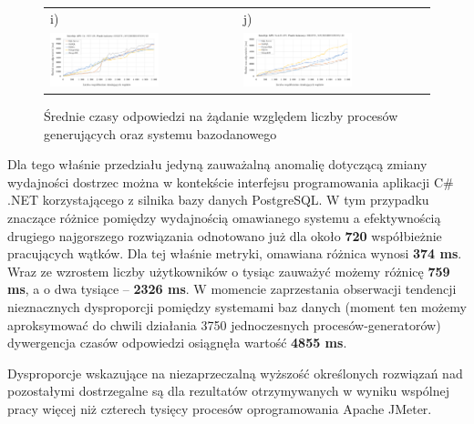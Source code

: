 \begin{figure}[H]
  \advance\leftskip-1.7cm
	\begin{tabular}{@{}ll@{}}
    i) & j) \\
    \includegraphics[width=0.6\textwidth]{rys05/response-dotnet-deleteReservation.pdf} & \includegraphics[width=0.6\textwidth]{rys05/response-nodejs-deleteReservation.pdf} \\
	\end{tabular}
  \caption{Średnie czasy odpowiedzi na żądanie względem liczby procesów generujących oraz systemu bazodanowego}
  \label{fig:response-mtc-1-2}
\end{figure}

Dla tego właśnie przedziału jedyną zauważalną anomalię dotyczącą zmiany wydajności dostrzec można w kontekście interfejsu programowania aplikacji C\# .NET korzystającego z silnika bazy danych PostgreSQL. W tym przypadku znaczące różnice pomiędzy wydajnością omawianego systemu a efektywnością drugiego najgorszego rozwiązania odnotowano już dla około \textbf{720} współbieżnie pracujących wątków. Dla tej właśnie metryki, omawiana różnica wynosi \textbf{374 ms}. Wraz ze wzrostem liczby użytkowników o tysiąc zauważyć możemy różnicę \textbf{759 ms}, a o dwa tysiące -- \textbf{2326 ms}. W momencie zaprzestania obserwacji tendencji nieznacznych dysproporcji pomiędzy systemami baz danych (moment ten możemy aproksymować do chwili działania 3750 jednoczesnych procesów-generatorów) dywergencja czasów odpowiedzi osiągnęła wartość \textbf{4855 ms}.

Dysproporcje wskazujące na niezaprzeczalną wyższość określonych rozwiązań nad pozostałymi dostrzegalne są dla rezultatów otrzymywanych w wyniku wspólnej pracy więcej niż czterech tysięcy procesów oprogramowania Apache JMeter. 

